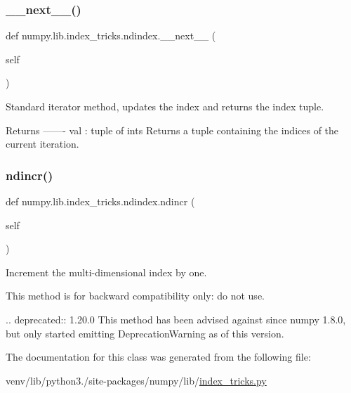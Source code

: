 \mbox{\label{classnumpy_1_1lib_1_1index__tricks_1_1ndindex_a15882d2fe51484db60724b4a3df4759f}} 
\subsubsection{\texorpdfstring{\+\_\+\+\_\+next\+\_\+\+\_\+()}{\_\_next\_\_()}}
{\footnotesize\ttfamily def numpy.\+lib.\+index\+\_\+tricks.\+ndindex.\+\_\+\+\_\+next\+\_\+\+\_\+ (\begin{DoxyParamCaption}\item[{}]{self }\end{DoxyParamCaption})}

\begin{DoxyVerb}Standard iterator method, updates the index and returns the index
tuple.

Returns
-------
val : tuple of ints
    Returns a tuple containing the indices of the current
    iteration.\end{DoxyVerb}
 \mbox{\label{classnumpy_1_1lib_1_1index__tricks_1_1ndindex_a90e5b99598cf0164b5c0409049c51861}} 
\subsubsection{\texorpdfstring{ndincr()}{ndincr()}}
{\footnotesize\ttfamily def numpy.\+lib.\+index\+\_\+tricks.\+ndindex.\+ndincr (\begin{DoxyParamCaption}\item[{}]{self }\end{DoxyParamCaption})}

\begin{DoxyVerb}Increment the multi-dimensional index by one.

This method is for backward compatibility only: do not use.

.. deprecated:: 1.20.0
    This method has been advised against since numpy 1.8.0, but only
    started emitting DeprecationWarning as of this version.
\end{DoxyVerb}
 

The documentation for this class was generated from the following file\+:\begin{DoxyCompactItemize}
\item 
venv/lib/python3./site-\/packages/numpy/lib/\hyperlink{lib_2index__tricks_8py}{index\+\_\+tricks.\+py}\end{DoxyCompactItemize}
